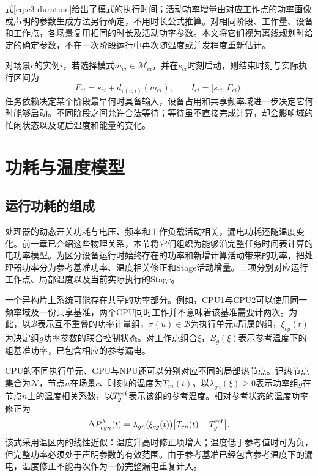 式\eqref{eq:c3-duration}给出了模式的执行时间；活动功率增量由对应工作点的功率画像或声明的参数生成方法另行确定，不用时长公式推算。对相同阶段、工作量、设备和工作点，各场景复用相同的时长及活动功率参数。本文将它们视为离线规划时给定的确定参数，不在一次阶段运行中再次随温度或并发程度重新估计。

对场景$c$的实例$i$，若选择模式$m_{ci}\in\mathcal M_{ci}$，并在$s_{ci}$时刻启动，则结束时刻与实际执行区间为
\begin{equation}
 F_{ci}=s_{ci}+d_{\tau(c,i)}(m_{ci}),\qquad
 I_{ci}=[s_{ci},F_{ci}).
 \label{eq:c3-stage-time}
\end{equation}
任务依赖决定某个阶段最早何时具备输入，设备占用和共享频率域进一步决定它何时能够启动。不同阶段之间允许合法等待；等待虽不直接完成计算，却会影响域的忙闲状态以及随后温度和能量的变化。

\section{功耗与温度模型}

\subsection{运行功耗的组成}

处理器的动态开关功耗与电压、频率和工作负载活动相关，漏电功耗还随温度变化。前一章已介绍这些物理关系，本节将它们组织为能够沿完整任务时间表计算的电功率模型。为区分设备运行时始终存在的功率和新增计算活动带来的功率，把处理器功率分为参考基准功率、温度相关修正和Stage活动增量。三项分别对应运行工作点、局部温度以及当前实际执行的Stage。

一个异构片上系统可能存在共享的功率部分。例如，CPU1与CPU2可以使用同一频率域及一份共享基准，两个CPU同时工作并不意味着该基准需要计两次。为此，以$\mathcal B$表示互不重叠的功率计量组，$\pi(u)\in\mathcal B$为执行单元$u$所属的组，$\xi_{cg}(t)$为决定组$g$功率参数的联合控制状态。对工作点组合$\xi$，$B_g(\xi)$表示参考温度下的组基准功率，已包含相应的参考漏电。

CPU的不同执行单元、GPU与NPU还可以分别对应不同的局部热节点。记热节点集合为$\mathcal N$，节点$n$在场景$c$、时刻$t$的温度为$T_{cn}(t)$。以$\lambda_{gn}(\xi)\ge0$表示功率组$g$在节点$n$上的温度相关系数，以$T_g^{\rm ref}$表示该组的参考温度。相对参考状态的温度功率修正为
\begin{equation}
 \Delta P^\lambda_{cgn}(t)=
 \lambda_{gn}(\xi_{cg}(t))
 \bigl[T_{cn}(t)-T_g^{\rm ref}\bigr].
 \label{eq:c3-leak}
\end{equation}
该式采用温区内的线性近似：温度升高时修正项增大；温度低于参考值时可为负，但完整功率必须处于声明参数的有效范围。由于参考基准已经包含参考温度下的漏电，温度修正不能再次作为一份完整漏电重复计入。

